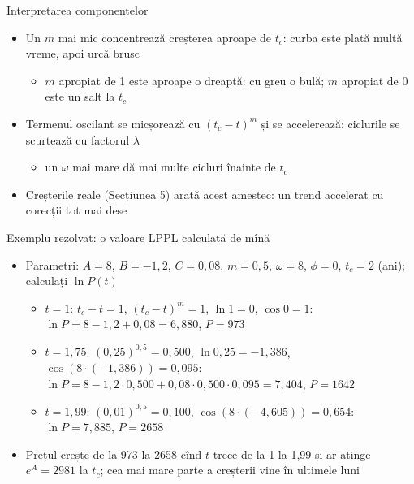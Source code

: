 \begin{frame}{Interpretarea componentelor}
\itemsize{\small}
\begin{itemize}
    \item Un $m$ mai mic concentrează creșterea aproape de $t_c$: curba este plată multă vreme, apoi urcă brusc
    \begin{itemize}
        \item $m$ apropiat de 1 este aproape o dreaptă: cu greu o bulă; $m$ apropiat de 0 este un salt la $t_c$
    \end{itemize}
    \item Termenul oscilant se micșorează cu $(t_c - t)^m$ și se accelerează: ciclurile se scurtează cu factorul $\lambda$
    \begin{itemize}
        \item un $\omega$ mai mare dă mai multe cicluri înainte de $t_c$
    \end{itemize}
    \item Creșterile reale (Secțiunea 5) arată acest amestec: un trend accelerat cu corecții tot mai dese
\end{itemize}
\end{frame}

\begin{frame}{Exemplu rezolvat: o valoare LPPL calculată de mînă}
\itemsize{\footnotesize}
\begin{itemize}
    \item Parametri: $A = 8$, $B = -1{,}2$, $C = 0{,}08$, $m = 0{,}5$, $\omega = 8$, $\phi = 0$, $t_c = 2$ (ani); calculați $\ln P(t)$
    \begin{itemize}
        \item $t = 1$: $t_c - t = 1$, $(t_c - t)^m = 1$, $\ln 1 = 0$, $\cos 0 = 1$: $\ln P = 8 - 1{,}2 + 0{,}08 = 6{,}880$, $P = 973$
        \item $t = 1{,}75$: $(0{,}25)^{0{,}5} = 0{,}500$, $\ln 0{,}25 = -1{,}386$, $\cos(8 \cdot (-1{,}386)) = 0{,}095$: $\ln P = 8 - 1{,}2 \cdot 0{,}500 + 0{,}08 \cdot 0{,}500 \cdot 0{,}095 = 7{,}404$, $P = 1642$
        \item $t = 1{,}99$: $(0{,}01)^{0{,}5} = 0{,}100$, $\cos(8 \cdot (-4{,}605)) = 0{,}654$: $\ln P = 7{,}885$, $P = 2658$
    \end{itemize}
    \item Prețul crește de la 973 la 2658 cînd $t$ trece de la 1 la 1,99 și ar atinge $e^A = 2981$ la $t_c$; cea mai mare parte a creșterii vine în ultimele luni
\end{itemize}
\end{frame}


